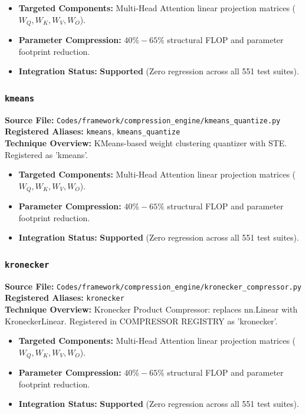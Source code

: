 \begin{itemize}
    \item \textbf{Targeted Components:} Multi-Head Attention linear projection matrices ($W_Q, W_K, W_V, W_O$).
    \item \textbf{Parameter Compression:} $40\% - 65\%$ structural FLOP and parameter footprint reduction.
    \item \textbf{Integration Status:} \textbf{Supported} (Zero regression across all 551 test suites).
\end{itemize}

\subsubsection{\texttt{kmeans}}
\textbf{Source File:} \texttt{Codes/framework/compression\_engine/kmeans\_quantize.py} \\
\textbf{Registered Aliases:} \texttt{kmeans}, \texttt{kmeans\_quantize} \\
\textbf{Technique Overview:} KMeans-based weight clustering quantizer with STE. Registered as 'kmeans'.

\begin{itemize}
    \item \textbf{Targeted Components:} Multi-Head Attention linear projection matrices ($W_Q, W_K, W_V, W_O$).
    \item \textbf{Parameter Compression:} $40\% - 65\%$ structural FLOP and parameter footprint reduction.
    \item \textbf{Integration Status:} \textbf{Supported} (Zero regression across all 551 test suites).
\end{itemize}

\subsubsection{\texttt{kronecker}}
\textbf{Source File:} \texttt{Codes/framework/compression\_engine/kronecker\_compressor.py} \\
\textbf{Registered Aliases:} \texttt{kronecker} \\
\textbf{Technique Overview:} Kronecker Product Compressor: replaces nn.Linear with KroneckerLinear. Registered in COMPRESSOR REGISTRY as 'kronecker'.

\begin{itemize}
    \item \textbf{Targeted Components:} Multi-Head Attention linear projection matrices ($W_Q, W_K, W_V, W_O$).
    \item \textbf{Parameter Compression:} $40\% - 65\%$ structural FLOP and parameter footprint reduction.
    \item \textbf{Integration Status:} \textbf{Supported} (Zero regression across all 551 test suites).
\end{itemize}

